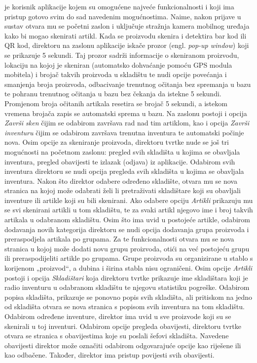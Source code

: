 		 je korisnik aplikacije kojem su omogućene najveće funkcionalnosti i koji ima pristup gotovo svim do sad navedenim mogućnostima. Naime, nakon prijave u sustav otvara mu se početni zaslon i uključuje stražnja kamera mobilnog uređaja kako bi mogao skenirati artikl. Kada se proizvodu skenira i detektira bar kod ili QR kod, direktoru na zaslonu aplikacije iskače prozor (engl. \emph{pop-up window}) koji se prikazuje 5 sekundi. Taj prozor sadrži informacije o skeniranom proizvodu, lokaciju na kojoj je skeniran (automatsko dohvaćanje pomoću GPS modula mobitela) i brojač takvih proizvoda u skladištu te nudi opcije povećanja i smanjenja broja proizvoda, odbacivanje trenutnog očitanja bez spremanja u bazu te pohranu trenutnog očitanja u bazu bez čekanja da istekne 5 sekundi. Promjenom broja očitanih artikala resetira se brojač 5 sekundi, a istekom vremena brojača zapis se automatski sprema u bazu. Na zaslonu postoji i opcija \emph{Završi sken} čijim se odabirom završava rad nad tim artiklom, kao i opcija \emph{Završi inventuru} čijim se odabirom završava trenutna inventura te automatski počinje nova. Osim opcije za skeniranje proizvoda, direktoru tvrtke nude se još tri mogućnosti na početnom zaslonu: pregled svih skladišta u kojima se obavljala inventura, pregled obavijesti te izlazak (odjava) iz aplikacije. Odabirom svih inventura direktoru se nudi opcija pregleda svih skladišta u kojima se obavljala inventura. Nakon što direktor odabere određeno skladište, otvara mu se nova stranica na kojoj može odabrati želi li pretraživati skladištare koji su obavljali inventure ili artikle koji su bili skenirani. Ako odabere opciju \emph{Artikli} prikazuju mu se svi skenirani artikli u tom skladištu, te za svaki artikl njegovo ime i broj takvih artikala u odabranom skladištu. Osim što ima uvid u postojeće artikle, odabirom dodavanja novih kategorija direktoru se nudi opcija dodavanja grupa proizvoda i preraspodjela artikala po grupama. Za te funkcionalnosti otvara mu se nova stranica u kojoj može dodati novu grupu proizvoda, otići na već postojeću grupu ili preraspodijeliti artikle po grupama. Grupe proizvoda su organizirane u stablo s korijenom „proizvod“, a dubina i širina stabla nisu ograničeni. Osim opcije \emph{Artikli} postoji i opcija \emph{Skladištari} koja direktoru tvrtke prikazuje ime skladištara koji je radio inventuru u odabranom skladištu te njegovu statistiku pogreške. Odabirom popisa skladišta, prikazuje se ponovno popis svih skladišta, ali pritiskom na jedno od skladišta otvara se nova stranica s popisom svih inventura na tom skladištu. Odabirom određene inventure, direktor ima uvid u sve proizvode koji su se skenirali u toj inventuri. Odabirom opcije pregleda obavijesti, direktoru tvrtke otvara se stranica s obavijestima koje su poslali šefovi skladišta. Navedene obavijesti direktor može označiti odabirom odgovarajuće opcije kao riješene ili kao odbačene. Također, direktor ima pristup povijesti svih obavijesti.\\
		
